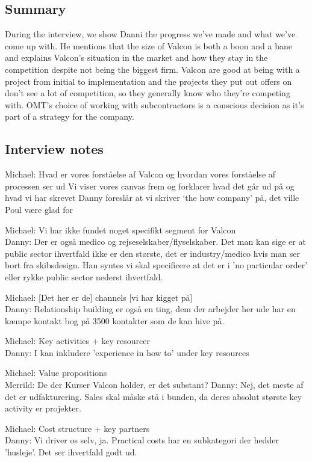 \label{app:danni_inline}
\begin{linenumbers*}
\subsection{Summary}
During the interview, we show Danni the progress we've made and what we've come up with. 
He mentions that the size of Valcon is both a boon and a bane and explains Valcon's situation in the market and how they stay in the competition despite not being the biggest firm. 
Valcon are good at being with a project from initial to implementation and the projects they put out offers on don't see a lot of competition, so they generally know who they're competing with. 
OMT's choice of working with subcontractors is a conscious decision as it's part of a strategy for the company.

\subsection{Interview notes}
Michael: Hvad er vores forståelse af Valcon og hvordan vores forståelse af processen ser ud
Vi viser vores canvas frem og forklarer hvad det går ud på og hvad vi har skrevet
Danny foreslår at vi skriver ‘the how company’ på, det ville Poul være glad for

Michael: Vi har ikke fundet noget specifikt segment for Valcon\\
Danny: Der er også medico og rejseselskaber/flyselskaber. Det man kan sige er at public sector ihvertfald ikke er den største, det er industry/medico hvis man ser bort fra skibsdesign. Han syntes vi skal specificere at det er i 'no particular order' eller rykke public sector nederst ihvertfald.

Michael: [Det her er de] channels [vi har kigget på]\\
Danny: Relationship building er også en ting, dem der arbejder her ude har en kæmpe kontakt bog på 3500 kontakter som de kan hive på.

Michael: Key activities + key resourcer\\
Danny: I kan inkludere 'experience in how to' under key resources

Michael: Value propositions\\
Merrild: De der Kurser Valcon holder, er det substant?
Danny: Nej, det meste af det er udfakturering. Sales skal måske stå i bunden, da deres absolut største key activity er projekter.

Michael: Cost structure + key partners\\
Danny: Vi driver os selv, ja. Practical costs har en subkategori der hedder 'husleje'. Det ser ihvertfald godt ud.


\end{linenumbers*}
